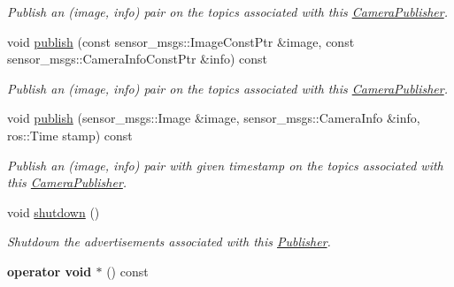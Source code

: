\begin{DoxyCompactItemize}
\begin{DoxyCompactList}\small\item\em Publish an (image, info) pair on the topics associated with this \hyperlink{classimage__transport_1_1_camera_publisher}{Camera\-Publisher}. \end{DoxyCompactList}\item 
\hypertarget{classimage__transport_1_1_camera_publisher_a9817973953b5c2a4abfcca5e8cdc0417}{void \hyperlink{classimage__transport_1_1_camera_publisher_a9817973953b5c2a4abfcca5e8cdc0417}{publish} (const sensor\-\_\-msgs\-::\-Image\-Const\-Ptr \&image, const sensor\-\_\-msgs\-::\-Camera\-Info\-Const\-Ptr \&info) const }\label{classimage__transport_1_1_camera_publisher_a9817973953b5c2a4abfcca5e8cdc0417}

\begin{DoxyCompactList}\small\item\em Publish an (image, info) pair on the topics associated with this \hyperlink{classimage__transport_1_1_camera_publisher}{Camera\-Publisher}. \end{DoxyCompactList}\item 
void \hyperlink{classimage__transport_1_1_camera_publisher_a711734f50f1f4d1a73e752c98170bd07}{publish} (sensor\-\_\-msgs\-::\-Image \&image, sensor\-\_\-msgs\-::\-Camera\-Info \&info, ros\-::\-Time stamp) const 
\begin{DoxyCompactList}\small\item\em Publish an (image, info) pair with given timestamp on the topics associated with this \hyperlink{classimage__transport_1_1_camera_publisher}{Camera\-Publisher}. \end{DoxyCompactList}\item 
\hypertarget{classimage__transport_1_1_camera_publisher_abf00316990194ba126c371b51f6b2ba8}{void \hyperlink{classimage__transport_1_1_camera_publisher_abf00316990194ba126c371b51f6b2ba8}{shutdown} ()}\label{classimage__transport_1_1_camera_publisher_abf00316990194ba126c371b51f6b2ba8}

\begin{DoxyCompactList}\small\item\em Shutdown the advertisements associated with this \hyperlink{classimage__transport_1_1_publisher}{Publisher}. \end{DoxyCompactList}\item 
\hypertarget{classimage__transport_1_1_camera_publisher_adba3db904b3a92973643130ba0c06134}{{\bfseries operator void $\ast$} () const }\label{classimage__transport_1_1_camera_publisher_adba3db904b3a92973643130ba0c06134}


\end{DoxyCompactItemize}
